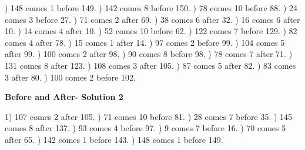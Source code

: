 \documentclass{article}%
\begin{document}
) 148 comes 1 before 149.%
) 142 comes 8 before 150.%
) 78 comes 10 before 88.%
) 24 comes 3 before 27.%
) 71 comes 2 after 69.%
) 38 comes 6 after 32.%
) 16 comes 6 after 10.%
) 14 comes 4 after 10.%
) 52 comes 10 before 62.%
) 122 comes 7 before 129.%
) 82 comes 4 after 78.%
) 15 comes 1 after 14.%
) 97 comes 2 before 99.%
) 104 comes 5 after 99.%
) 100 comes 2 after 98.%
) 90 comes 8 before 98.%
) 78 comes 7 after 71.%
) 131 comes 8 after 123.%
) 108 comes 3 after 105.%
) 87 comes 5 after 82.%
) 83 comes 3 after 80.%
) 100 comes 2 before 102.%
\newline%
\newpage%
\large%
\begin{center}%
\textbf{Before and After- Solution 2}%
\newline%
\end{center} \normalsize%
1) 107 comes 2 after 105.%
) 71 comes 10 before 81.%
) 28 comes 7 before 35.%
) 145 comes 8 after 137.%
) 93 comes 4 before 97.%
) 9 comes 7 before 16.%
) 70 comes 5 after 65.%
) 142 comes 1 before 143.%
) 148 comes 1 before 149.%
\end{document}
